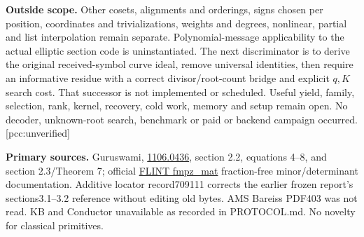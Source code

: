 \documentclass[10pt]{article}
\begin{document}
\textbf{Outside scope.} Other cosets, alignments and orderings, signs chosen per
position, coordinates and trivializations, weights and degrees, nonlinear,
partial and list interpolation remain separate. Polynomial-message applicability to the
actual elliptic section code is uninstantiated. The next discriminator is to
derive the original received-symbol curve ideal, remove universal identities,
then require an informative residue with a correct divisor/root-count bridge
and explicit $q,K$ search cost. That successor is not implemented or scheduled.
Useful yield, family, selection, rank, kernel, recovery, cold work, memory and setup
remain open. No decoder, unknown-root search, benchmark or paid or backend
campaign occurred. [pcc:unverified]

\textbf{Primary sources.} Guruswami,
\href{https://arxiv.org/pdf/1106.0436}{1106.0436}, section 2.2, equations 4--8,
and section 2.3/Theorem 7; official
\href{https://flintlib.org/doc/fmpz_mat/index.html}{FLINT fmpz\_mat}
fraction-free minor/determinant documentation. Additive locator record709111
corrects the earlier frozen report's sections3.1--3.2 reference without
editing old bytes. AMS Bareiss PDF403 was not read. KB and Conductor
unavailable as recorded in PROTOCOL.md. No novelty for classical primitives.
\end{document}
